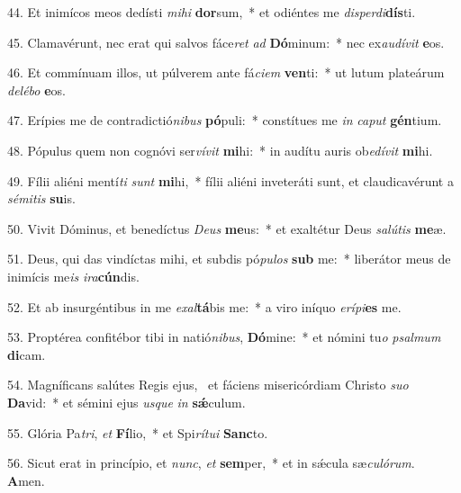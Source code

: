 44. Et inimícos meos dedísti \textit{mi}\textit{hi} \textbf{dor}sum,~*  et odiéntes me \textit{dis}\textit{per}\textit{di}\textbf{dís}ti.\

45. Clamavérunt, nec erat qui salvos fáce\textit{ret} \textit{ad} \textbf{Dó}minum:~*  nec ex\textit{au}\textit{dí}\textit{vit} \textbf{e}os.\

46. Et commínuam illos, ut púlverem ante fá\textit{ci}\textit{em} \textbf{ven}ti:~*  ut lutum plateárum \textit{de}\textit{lé}\textit{bo} \textbf{e}os.\

47. Erípies me de contradictió\textit{ni}\textit{bus} \textbf{pó}puli:~*  constítues me \textit{in} \textit{ca}\textit{put} \textbf{gén}tium.\

48. Pópulus quem non cognóvi ser\textit{ví}\textit{vit} \textbf{mi}hi:~*  in audítu auris ob\textit{e}\textit{dí}\textit{vit} \textbf{mi}hi.\

49. Fílii aliéni mentí\textit{ti} \textit{sunt} \textbf{mi}hi,~*  fílii aliéni inveteráti sunt, et claudicavérunt a \textit{sé}\textit{mi}\textit{tis} \textbf{su}is.\

50. Vivit Dóminus, et benedíctus \textit{De}\textit{us} \textbf{me}us:~*  et exaltétur Deus \textit{sa}\textit{lú}\textit{tis} \textbf{me}æ.\

51. Deus, qui das vindíctas mihi, et subdis pó\textit{pu}\textit{los} \textbf{sub} me:~*  liberátor meus de inimícis me\textit{is} \textit{i}\textit{ra}\textbf{cún}dis.\

52. Et ab insurgéntibus in me \textit{ex}\textit{al}\textbf{tá}bis me:~*  a viro iníquo \textit{e}\textit{rí}\textit{pi}\textbf{es} me.\

53. Proptérea confitébor tibi in natió\textit{ni}\textit{bus}, \textbf{Dó}mine:~*  et nómini tu\textit{o} \textit{psal}\textit{mum} \textbf{di}cam.\

54. Magníficans salútes Regis ejus, \dag\  et fáciens misericórdiam Christo \textit{su}\textit{o} \textbf{Da}vid:~*  et sémini ejus \textit{us}\textit{que} \textit{in} \textbf{sǽ}culum.\

55. Glória Pa\textit{tri}, \textit{et} \textbf{Fí}lio,~*  et Spi\textit{rí}\textit{tu}\textit{i} \textbf{Sanc}to.\

56. Sicut erat in princípio, et \textit{nunc}, \textit{et} \textbf{sem}per,~*  et in sǽcula sæ\textit{cu}\textit{ló}\textit{rum}. \textbf{A}men.\

